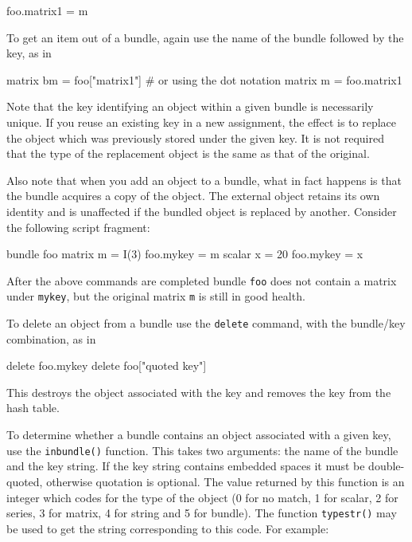 \begin{code}
foo.matrix1 = m
\end{code}

To get an item out of a bundle, again use the name of the bundle
followed by the key, as in

\begin{code}
matrix bm = foo["matrix1"]
# or using the dot notation
matrix m = foo.matrix1
\end{code}

Note that the key identifying an object within a given bundle is
necessarily unique. If you reuse an existing key in a new assignment,
the effect is to replace the object which was previously stored under
the given key. It is not required that the type of the replacement
object is the same as that of the original.

Also note that when you add an object to a bundle, what in fact
happens is that the bundle acquires a copy of the object. The external
object retains its own identity and is unaffected if the bundled
object is replaced by another. Consider the following script fragment:

\begin{code}
bundle foo
matrix m = I(3)
foo.mykey = m
scalar x = 20
foo.mykey = x
\end{code}

After the above commands are completed bundle \texttt{foo} does not
contain a matrix under \texttt{mykey}, but the original matrix
\texttt{m} is still in good health.

To delete an object from a bundle use the \texttt{delete} command,
with the bundle/key combination, as in

\begin{code}
delete foo.mykey
delete foo["quoted key"]
\end{code}

This destroys the object associated with the key and removes the key
from the hash table.

To determine whether a bundle contains an object associated with a
given key, use the \texttt{inbundle()} function. This takes two
arguments: the name of the bundle and the key string. If the key
string contains embedded spaces it must be double-quoted, otherwise
quotation is optional. The value returned by this function is an
integer which codes for the type of the object (0 for no match, 1 for
scalar, 2 for series, 3 for matrix, 4 for string and 5 for
bundle). The function \texttt{typestr()} may be used to get the string
corresponding to this code. For example:

